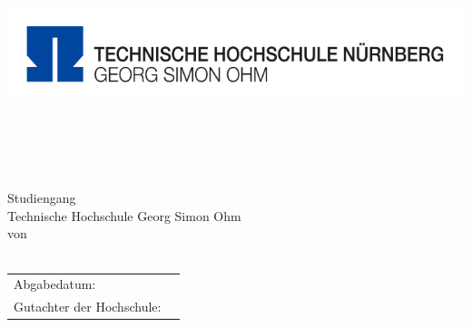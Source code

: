 \thispagestyle{plain}
\begin{titlepage}
\enlargethispage{3.5cm}
\sffamily 								%
\begin{minipage}{\textwidth}
	\vspace{-2cm}
	\noindent \includegraphics[scale=0.2]{Images/Logo_TH.png} \hfill
\end{minipage} 
\begin{center}

\huge{\textsc{\textbf{\titel}}}\\[1.5ex]
\Large{\textbf{\untertitel}}\\[5ex]
\LARGE{\textbf{\arbeit}}\\[2ex]
\normalsize{~}\\[3ex]
\Large{Studiengang \textit{\studiengang}}\\[1ex]
\normalsize{Technische Hochschule Georg Simon Ohm}\\[5ex]
von\\[1ex] \autor \\[12ex]

\begin{tabular}{ll}
	Abgabedatum:					& \quad \abgabe \\ 
	Gutachter der Hochschule: & \quad \betreuerth \\ 
	[6ex]%
	
\end{tabular} 

\end{center}

\end{titlepage}
\onehalfspacing